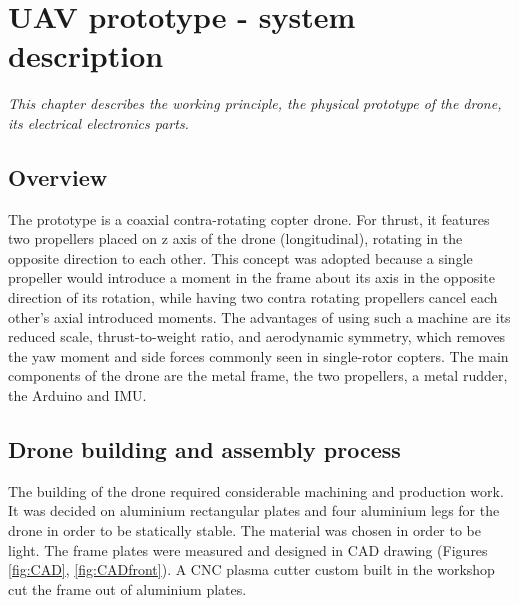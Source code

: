 \chapter{UAV prototype - system description}
\textit{This chapter describes the working principle, the physical prototype of the drone, its electrical electronics parts.}

\section{Overview}
 
The prototype is a coaxial contra-rotating copter drone. For thrust, it features two propellers placed on z axis of the drone (longitudinal), rotating in the opposite direction to each other. 
This concept was adopted because a single propeller would introduce a moment in the frame about its axis in the opposite direction of its rotation, while having two contra rotating propellers cancel each other’s axial introduced moments. 
 The advantages of using such a machine are its reduced scale, thrust-to-weight ratio,  and  aerodynamic symmetry, which removes the yaw moment and side forces commonly seen in single-rotor copters. \cite{wang2014flight} 
 The main components of the drone are the metal frame, the two propellers, a metal rudder, the Arduino and IMU.
 

 \section{Drone building and assembly process}

The building of the drone required considerable machining and production work. 
It was decided on aluminium rectangular plates and four aluminium legs for the drone in order to be statically stable. The material was chosen in order to be light. 
The frame plates were measured and designed in CAD drawing (Figures \ref{fig:CAD}, \ref{fig:CADfront}). A CNC plasma cutter custom built in the workshop cut the frame out of aluminium plates. 

